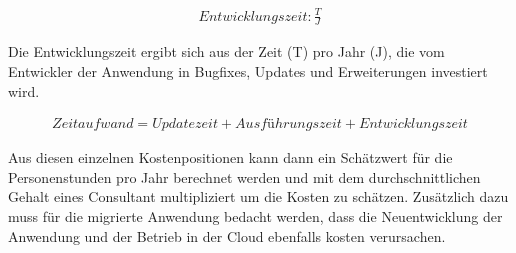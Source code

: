 \begin{align}
    Entwicklungszeit: \frac{T}{J}
\end{align}

Die Entwicklungszeit ergibt sich aus der Zeit (T) pro Jahr (J), die vom Entwickler der Anwendung in Bugfixes, Updates und Erweiterungen investiert wird.

\begin{align}
    Zeitaufwand = Updatezeit + Ausführungszeit + Entwicklungszeit
\end{align}

Aus diesen einzelnen Kostenpositionen kann dann ein Schätzwert für die Personenstunden pro Jahr berechnet werden und mit dem durchschnittlichen Gehalt eines Consultant multipliziert um die Kosten zu schätzen. Zusätzlich dazu muss für die migrierte Anwendung bedacht werden, dass die Neuentwicklung der Anwendung und der Betrieb in der Cloud ebenfalls kosten verursachen.
\pagebreak